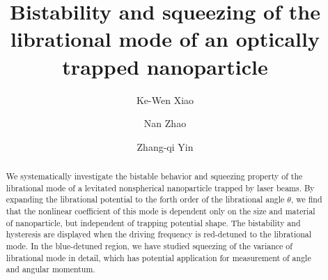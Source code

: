 \documentclass[pra,aps,superscriptaddress,showpacs,preprint]{revtex4}%
\begin{document}
\title{Bistability and squeezing of the librational mode of an optically trapped nanoparticle}
\author{Ke-Wen Xiao}

\author{Nan Zhao}

\author{Zhang-qi Yin}




\begin{abstract}
We systematically investigate the bistable behavior and squeezing property of the librational mode of a levitated nonspherical nanoparticle trapped by laser beams. By expanding the librational potential to the forth order of the librational angle $\theta$, we find that the nonlinear coefficient of this mode is dependent only on the size and material of nanoparticle, but independent of trapping potential shape. The bistability and hysteresis are displayed when the driving frequency is red-detuned to the librational mode. In the blue-detuned region, we have studied squeezing of the variance of librational mode in detail, which has potential application for measurement of angle and angular momentum.

\end{abstract}

\maketitle
\end{document}
